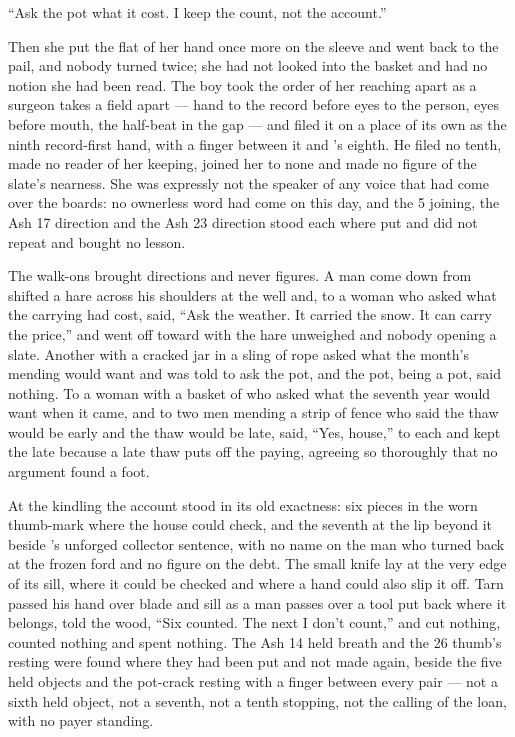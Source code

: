“Ask the pot what it cost. I keep the count, not the account.”

Then she put the flat of her hand once more on the sleeve and went back to the pail, and nobody turned twice; she had not looked into the basket and had no notion she had been read. The boy took the order of her reaching apart as a surgeon takes a field apart — hand to the record before eyes to the person, eyes before mouth, the half-beat in the gap — and filed it on a place of its own as the ninth record-first hand, with a finger between it and 's eighth. He filed no tenth, made no reader of her keeping, joined her to none and made no figure of the slate's nearness. She was expressly not the speaker of any voice that had come over the boards: no ownerless word had come on this day, and the  5 joining, the Ash 17 direction and the Ash 23 direction stood each where put and did not repeat and bought no lesson.

The walk-ons brought directions and never figures. A man come down from  shifted a hare across his shoulders at the well and, to a woman who asked what the carrying had cost, said, “Ask the weather. It carried the snow. It can carry the price,” and went off toward  with the hare unweighed and nobody opening a slate. Another with a cracked jar in a sling of rope asked what the month's mending would want and was told to ask the pot, and the pot, being a pot, said nothing. To a woman with a basket of  who asked what the seventh year would want when it came, and to two men mending a strip of fence who said the thaw would be early and the thaw would be late,  said, “Yes, house,” to each and kept the late because a late thaw puts off the paying, agreeing so thoroughly that no argument found a foot.

\scenebreak

At the kindling the account stood in its old exactness: six pieces in the worn thumb-mark where the house could check, and the seventh at the lip beyond it beside 's unforged collector sentence, with no name on the man who turned back at the frozen ford and no figure on the debt. The small knife lay at the very edge of its sill, where it could be checked and where a hand could also slip it off. Tarn passed his hand over blade and sill as a man passes over a tool put back where it belongs, told the wood, “Six counted. The next I don't count,” and cut nothing, counted nothing and spent nothing. The Ash 14 held breath and the  26 thumb's resting were found where they had been put and not made again, beside the five held objects and the pot-crack resting with a finger between every pair — not a sixth held object, not a seventh, not a tenth stopping, not the calling of the loan, with no payer standing.

